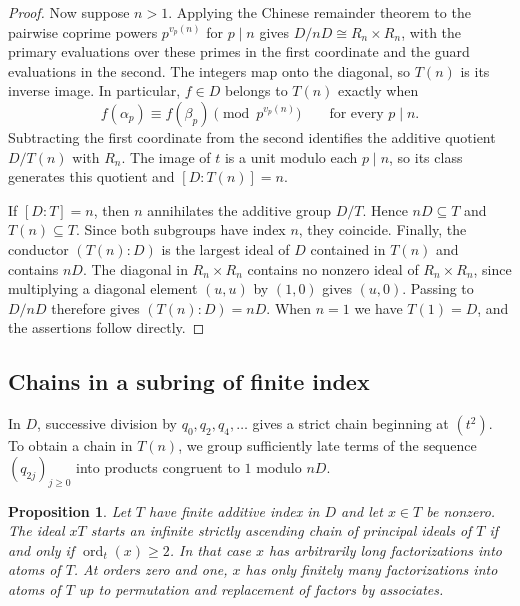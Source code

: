 \documentclass{article}
\DeclareMathOperator{\ord}{ord}
\newtheorem{proposition}{Proposition}[section]
\theoremstyle{remark}
\begin{document}
\begin{proof}
    Now suppose $n > 1$.
    Applying the Chinese remainder theorem to the pairwise coprime powers $p^{v_p(n)}$ for $p \mid n$ gives $D/nD \cong R_n \times R_n$, with the primary evaluations over these primes in the first coordinate and the guard evaluations in the second.
    The integers map onto the diagonal, so $T(n)$ is its inverse image.
    In particular, $f \in D$ belongs to $T(n)$ exactly when
    \[
        f(\alpha_p) \equiv f(\beta_p) \pmod{p^{v_p(n)}} \qquad\text{for every } p \mid n.
    \]
    Subtracting the first coordinate from the second identifies the additive quotient $D/T(n)$ with $R_n$.
    The image of $t$ is a unit modulo each $p \mid n$, so its class generates this quotient and $[D : T(n)] = n$.

    If $[D : T] = n$, then $n$ annihilates the additive group $D/T$.
    Hence $nD \subseteq T$ and $T(n) \subseteq T$.
    Since both subgroups have index $n$, they coincide.
    Finally, the conductor $(T(n) : D)$ is the largest ideal of $D$ contained in $T(n)$ and contains $nD$.
    The diagonal in $R_n \times R_n$ contains no nonzero ideal of $R_n \times R_n$, since multiplying a diagonal element $(u, u)$ by $(1, 0)$ gives $(u, 0)$.
    Passing to $D/nD$ therefore gives $(T(n) : D) = nD$.
    When $n = 1$ we have $T(1) = D$, and the assertions follow directly.
\end{proof}

\subsection{Chains in a subring of finite index}

In $D$, successive division by $q_0, q_2, q_4, \ldots$ gives a strict chain beginning at $(t^2)$.
To obtain a chain in $T(n)$, we group sufficiently late terms of the sequence $(q_{2j})_{j \ge 0}$ into products congruent to $1$ modulo $nD$.

\begin{proposition}
    \label{prop:subring-chain-order}
    Let $T$ have finite additive index in $D$ and let $x \in T$ be nonzero.
    The ideal $xT$ starts an infinite strictly ascending chain of principal ideals of $T$ if and only if $\ord_t(x) \ge 2$.
    In that case $x$ has arbitrarily long factorizations into atoms of $T$.
    At orders zero and one, $x$ has only finitely many factorizations into atoms of $T$ up to permutation and replacement of factors by associates.
\end{proposition}
\end{document}
